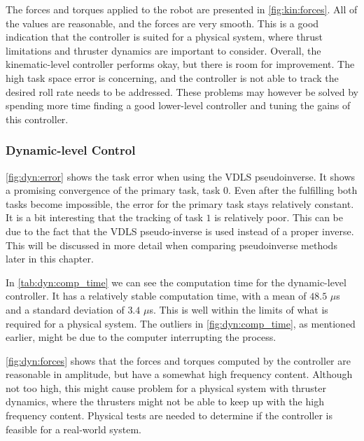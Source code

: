 The forces and torques applied to the robot are presented in \autoref{fig:kin:forces}.
All of the values are reasonable, and the forces are very smooth. This is a good
indication that the controller is suited for a physical system, where thrust limitations
and thruster dynamics are important to consider. Overall, the kinematic-level controller
performs okay, but there is room for improvement. The high task space error is
concerning, and the controller is not able to track the desired roll rate needs
to be addressed. These problems may however be solved by spending more time finding
a good lower-level controller and tuning the gains of this controller.

\subsubsection{Dynamic-level Control}

\autoref{fig:dyn:error} shows the task error when using the VDLS pseudoinverse.
It shows a promising convergence of the primary task, task $0$. Even after the
fulfilling both tasks become impossible, the error for the primary task stays
relatively constant. It is a bit interesting that the tracking of task $1$ is
relatively poor. This can be due to the fact that the VDLS pseudo-inverse is used
instead of a proper inverse. This will be discussed in more detail when comparing
pseudoinverse methods later in this chapter.

In \autoref{tab:dyn:comp_time} we can see the computation time for the dynamic-level
controller. It has a relatively stable computation time, with a mean of $48.5$ $\mu$s
and a standard deviation of $3.4$ $\mu$s. This is well within the limits of what
is required for a physical system. The outliers in \autoref{fig:dyn:comp_time},
as mentioned earlier, might be due to the computer interrupting the process.

\autoref{fig:dyn:forces} shows that the forces and torques computed by the controller
are reasonable in amplitude, but have a somewhat high frequency content. Although
not too high, this might cause problem for a physical system with thruster dynamics,
where the thrusters might not be able to keep up with the high frequency content.
Physical tests are needed to determine if the controller is feasible for a real-world
system.

